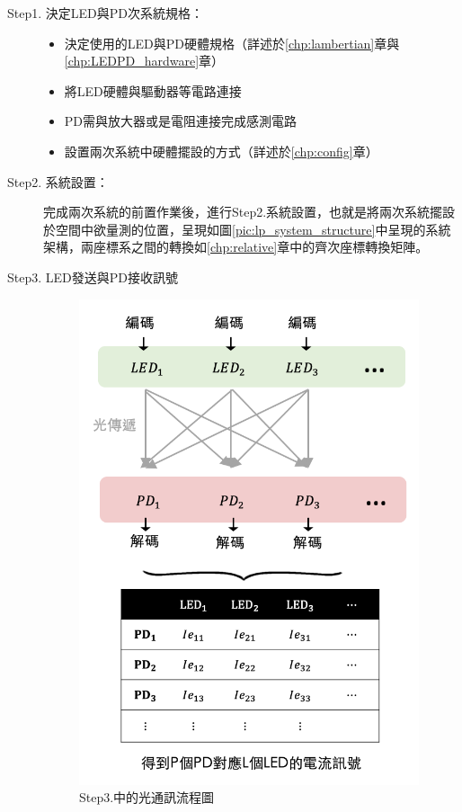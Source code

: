 \begin{description}
    \item[Step1. 決定LED與PD次系統規格：]
    
    \hfill
    
        \begin{itemize}
            \item 決定使用的LED與PD硬體規格（詳述於\ref{chp:lambertian}章與\ref{chp:LEDPD_hardware}章）
            \item 將LED硬體與驅動器等電路連接
            \item PD需與放大器或是電阻連接完成感測電路  
            \item 設置兩次系統中硬體擺設的方式（詳述於\ref{chp:config}章）
        \end{itemize}

    \item[Step2. 系統設置：] 
    
    \hfill
    
    \qquad 
    完成兩次系統的前置作業後，進行Step2.系統設置，也就是將兩次系統擺設於空間中欲量測的位置，呈現如圖\ref{pic:lp_system_structure}中呈現的系統架構，兩座標系之間的轉換如\ref{chp:relative}章中的齊次座標轉換矩陣。

    \item[Step3. LED發送與PD接收訊號]\hfill
    
    \begin{figure}[htpb]
        \centering
        \includegraphics[width=10cm]{ch2pic/vlc_flow_draw.png}
        \caption{Step3.中的光通訊流程圖}
        \label{pic:vlc_flow_draw}
    \end{figure}


\end{description}
